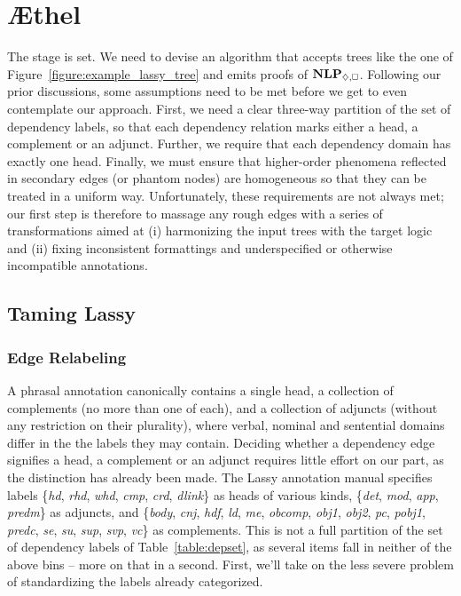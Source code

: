 \section{\AE thel}
\label{section:aethel}
The stage is set.
We need to devise an algorithm that accepts trees like the one of Figure~\ref{figure:example_lassy_tree} and emits proofs of $\NLP_{\diamond,\bx}$.
Following our prior discussions, some assumptions need to be met before we get to even contemplate our approach.
First, we need a clear three-way partition of the set of dependency labels, so that each dependency relation marks either a head, a complement or an adjunct.
Further, we require that each dependency domain has exactly one head.
Finally, we must ensure that higher-order phenomena reflected in secondary edges (or phantom nodes) are homogeneous so that they can be treated in a uniform way.
Unfortunately, these requirements are not always met; our first step is therefore to massage any rough edges with a series of transformations aimed at (i) harmonizing the input trees with the target logic and (ii) fixing inconsistent formattings and underspecified or otherwise incompatible annotations. 

\subsection{Taming Lassy}
\subsubsection{Edge Relabeling}
A phrasal annotation canonically contains a single head, a collection of complements (no more than one of each), and a collection of adjuncts (without any restriction on their plurality), where verbal, nominal and sentential domains differ in the the labels they may contain.
Deciding whether a dependency edge signifies a head, a complement or an adjunct requires little effort on our part, as the distinction has already been made.
The Lassy annotation manual specifies labels \{\textit{hd}, \textit{rhd}, \textit{whd}, \textit{cmp}, \textit{crd}, \textit{dlink}\} as heads of various kinds, \{\textit{det}, \textit{mod}, \textit{app}, \textit{predm}\} as adjuncts, and \{\textit{body}, \textit{cnj}, \textit{hdf}, \textit{ld}, \textit{me}, \textit{obcomp}, \textit{obj1}, \textit{obj2}, \textit{pc}, \textit{pobj1}, \textit{predc}, \textit{se}, \textit{su}, \textit{sup}, \textit{svp}, \textit{vc}\} as complements.
This is not a full partition of the set of dependency labels of Table~\ref{table:depset}, as several items fall in neither of the above bins -- more on that in a second.
First, we'll take on the less severe problem of standardizing the labels already categorized.

